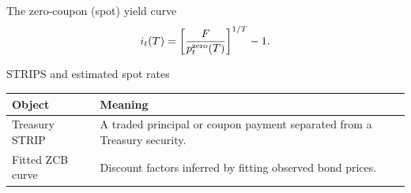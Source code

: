 \documentclass[12pt,aspectratio=169]{beamer}
\begin{document}

\begin{frame}{The zero-coupon (spot) yield curve}
\[i_t(T)=\left[\frac{F}{p_t^{\rm zero}(T)}\right]^{1/T}-1.\]
\end{frame}


\begin{frame}{STRIPS and estimated spot rates}
\begin{center}\begin{tabular}{@{}>{\raggedright\arraybackslash}p{}>{\raggedright\arraybackslash}p{}@{}}\toprule \textbf{Object} & \textbf{Meaning}\\\midrule Treasury STRIP & A traded principal or coupon payment separated from a Treasury security.\\[2mm]
Fitted ZCB curve & Discount factors inferred by fitting observed bond prices.\\\bottomrule\end{tabular}\end{center}
\end{frame}

\end{document}

